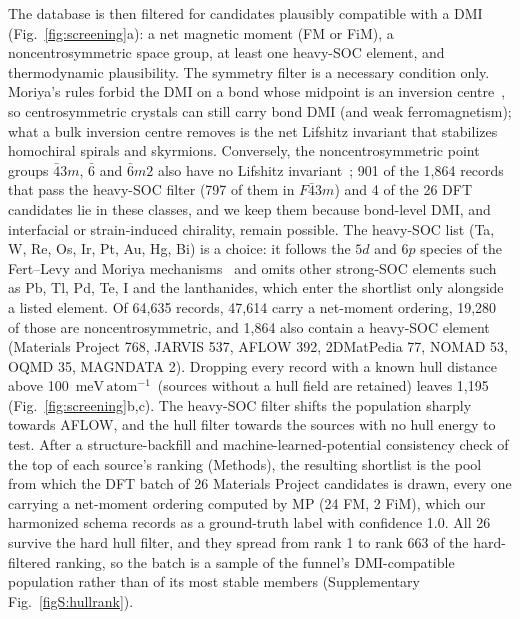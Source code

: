 \documentclass[aps,prb,preprint,superscriptaddress,longbibliography,nofootinbib]{revtex4-2}
\newcommand{\meVat}{\ensuremath{\mathrm{meV\,atom^{-1}}}}
\begin{document}
The database is then filtered for candidates plausibly compatible with a DMI (Fig.~\ref{fig:screening}a): a
net magnetic moment (FM or FiM), a noncentrosymmetric space group, at least one heavy-SOC element, and
thermodynamic plausibility. The symmetry filter is a necessary condition only. Moriya's rules forbid the DMI on
a bond whose midpoint is an inversion centre~\cite{moriya1960}, so centrosymmetric crystals can still carry bond
DMI (and weak ferromagnetism); what a bulk inversion centre removes is the net Lifshitz invariant that
stabilizes homochiral spirals and skyrmions. Conversely, the noncentrosymmetric point groups
$\bar{4}3m$, $\bar{6}$ and $\bar{6}m2$ also have no Lifshitz invariant~\cite{bogdanov1989,bogdanov1994}; 901 of the 1{,}864
records that pass the heavy-SOC filter (797 of them in $F\bar{4}3m$) and 4 of the 26 DFT candidates lie in these
classes, and we keep them because bond-level DMI, and interfacial or strain-induced chirality, remain possible.
The heavy-SOC list (Ta, W, Re, Os, Ir, Pt, Au, Hg, Bi) is a choice: it follows the
$5d$ and $6p$ species of the Fert--Levy and Moriya mechanisms~\cite{fert1980,moriya1960,crepieux1998,yang2015}
and omits other strong-SOC elements such as Pb, Tl, Pd, Te, I and the lanthanides, which enter the shortlist
only alongside a listed element. Of 64{,}635 records, 47{,}614 carry a net-moment ordering, 19{,}280 of those
are noncentrosymmetric, and 1{,}864 also contain a heavy-SOC element (Materials Project 768, JARVIS 537, AFLOW
392, 2DMatPedia 77, NOMAD 53, OQMD 35, MAGNDATA 2). Dropping every record with a known hull distance above
100~\meVat\ (sources without a hull field are retained) leaves 1{,}195 (Fig.~\ref{fig:screening}b,c).
The heavy-SOC filter shifts the population sharply towards AFLOW, and the hull filter towards the sources with
no hull energy to test. After a structure-backfill and machine-learned-potential consistency check of the top
of each source's ranking (Methods), the resulting shortlist is the pool from which the DFT batch of 26
Materials Project candidates is drawn, every one carrying a net-moment ordering computed by MP (24 FM, 2 FiM),
which our harmonized schema records as a ground-truth label with confidence 1.0. All 26 survive the
hard hull filter, and they spread from rank 1 to rank 663 of the hard-filtered ranking, so the batch is a
sample of the funnel's DMI-compatible population rather than of its most stable members (Supplementary
Fig.~\ref{figS:hullrank}).
\end{document}
